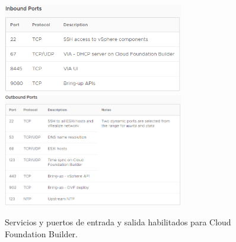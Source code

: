 \iffalse
\begin{figure}[h!]
  \centering
  \includegraphics[width=0.7\textwidth]{imaxes/conceptosPrevios/puertosentradaCB.png}
  \includegraphics[width=0.7\textwidth]{imaxes/conceptosPrevios/puertossalidaCB.png}
  \caption{Servicios y puertos de entrada y salida habilitados para Cloud Foundation Builder.}
  \label{fig:puertosCB}
\end{figure}

